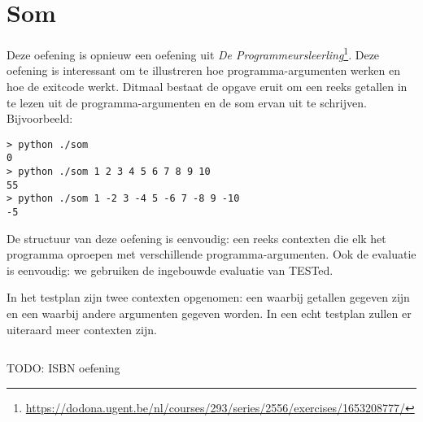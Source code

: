 \inputminted{json}{sources/division-plan.tson}

\section{Som}\label{sec:oefeningen-som}

Deze oefening is opnieuw een oefening uit \emph{De Programmeursleerling}\footnote{\url{https://dodona.ugent.be/nl/courses/293/series/2556/exercises/1653208777/}}.
Deze oefening is interessant om te illustreren hoe programma-argumenten werken en hoe de exitcode werkt.
Ditmaal bestaat de opgave eruit om een reeks getallen in te lezen uit de programma-argumenten en de som ervan uit te schrijven.
Bijvoorbeeld:

\begin{verbatim}
> python ./som
0
> python ./som 1 2 3 4 5 6 7 8 9 10
55
> python ./som 1 -2 3 -4 5 -6 7 -8 9 -10
-5
\end{verbatim}

De structuur van deze oefening is eenvoudig: een reeks contexten die elk het programma oproepen met verschillende programma-argumenten.
Ook de evaluatie is eenvoudig: we gebruiken de ingebouwde evaluatie van TESTed.

In het testplan zijn twee contexten opgenomen: een waarbij getallen gegeven zijn en een waarbij andere argumenten gegeven worden.
In een echt testplan zullen er uiteraard meer contexten zijn.

\inputminted{json}{sources/sum-plan.tson}

TODO: ISBN oefening